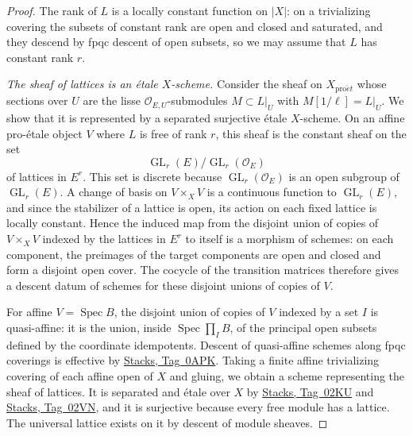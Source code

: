 \documentclass[11pt,a4paper]{article}
\numberwithin{equation}{section}
\theoremstyle{definition}
\theoremstyle{remark}
\newcommand{\proet}{\mathrm{pro}\acute{e}t}
\newcommand{\stacks}[1]{\href{https://stacks.math.columbia.edu/tag/#1}{\textnormal{Stacks, Tag~#1}}}
\DeclareMathOperator{\GL}{GL}
\begin{document}
\begin{proof}
The rank of $L$ is a locally constant function on $|X|$: on a
trivializing covering the subsets of constant rank are open and closed
and saturated, and they descend by fpqc descent of open subsets, so we
may assume that $L$ has constant rank $r$.

\emph{The sheaf of lattices is an \'etale $X$-scheme.} Consider the
sheaf on $X_{\proet}$ whose sections over $U$ are the lisse
$\mathcal O_{E,U}$-submodules $M\subset L|_U$ with $M[1/\ell]=L|_U$. We
show that it is represented by a separated surjective \'etale $X$-scheme.
On an affine pro-\'etale object $V$ where $L$ is free of rank $r$, this
sheaf is the constant sheaf on the set
\[
 \GL_r(E)/\GL_r(\mathcal O_E)
\]
of lattices in $E^r$. This set is discrete because $\GL_r(\mathcal O_E)$
is an open subgroup of $\GL_r(E)$. A change of basis on $V\times_XV$ is a
continuous function to $\GL_r(E)$, and since the stabilizer of a lattice
is open, its action on each fixed lattice is locally constant. Hence the
induced map from the disjoint union of copies of $V\times_XV$ indexed by
the lattices in $E^r$ to itself is a morphism of schemes: on each
component, the preimages of the target components are open and closed and
form a disjoint open cover. The cocycle of the transition matrices
therefore gives a descent datum of schemes for these disjoint unions of
copies of $V$.

For affine $V=\operatorname{Spec}B$, the disjoint union of copies of $V$
indexed by a set $I$ is quasi-affine: it is the union, inside
$\operatorname{Spec}\prod_IB$, of the principal open subsets defined by
the coordinate idempotents. Descent of quasi-affine schemes along fpqc
coverings is effective by \stacks{0APK}. Taking a finite affine
trivializing covering of each affine open of $X$ and gluing, we obtain a
scheme representing the sheaf of lattices. It is separated and \'etale
over $X$ by \stacks{02KU} and \stacks{02VN}, and it is surjective because
every free module has a lattice. The universal lattice exists on it by
descent of module sheaves.


\end{proof}
\end{document}
